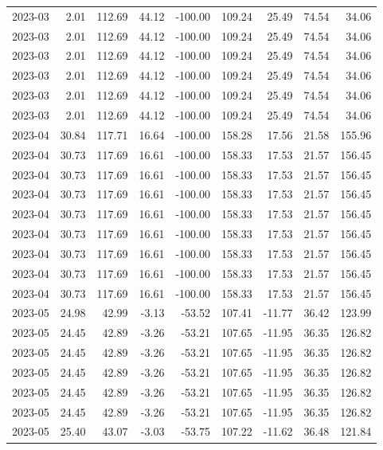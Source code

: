 \begin{table}[ht]
\begin{tabular}{lrrrrrrrr}
  2023-03 & 2.01 & 112.69 & 44.12 & -100.00 & 109.24 & 25.49 & 74.54 & 34.06 \\ 
  2023-03 & 2.01 & 112.69 & 44.12 & -100.00 & 109.24 & 25.49 & 74.54 & 34.06 \\ 
  2023-03 & 2.01 & 112.69 & 44.12 & -100.00 & 109.24 & 25.49 & 74.54 & 34.06 \\ 
  2023-03 & 2.01 & 112.69 & 44.12 & -100.00 & 109.24 & 25.49 & 74.54 & 34.06 \\ 
  2023-03 & 2.01 & 112.69 & 44.12 & -100.00 & 109.24 & 25.49 & 74.54 & 34.06 \\ 
  2023-03 & 2.01 & 112.69 & 44.12 & -100.00 & 109.24 & 25.49 & 74.54 & 34.06 \\ 
  2023-04 & 30.84 & 117.71 & 16.64 & -100.00 & 158.28 & 17.56 & 21.58 & 155.96 \\ 
  2023-04 & 30.73 & 117.69 & 16.61 & -100.00 & 158.33 & 17.53 & 21.57 & 156.45 \\ 
  2023-04 & 30.73 & 117.69 & 16.61 & -100.00 & 158.33 & 17.53 & 21.57 & 156.45 \\ 
  2023-04 & 30.73 & 117.69 & 16.61 & -100.00 & 158.33 & 17.53 & 21.57 & 156.45 \\ 
  2023-04 & 30.73 & 117.69 & 16.61 & -100.00 & 158.33 & 17.53 & 21.57 & 156.45 \\ 
  2023-04 & 30.73 & 117.69 & 16.61 & -100.00 & 158.33 & 17.53 & 21.57 & 156.45 \\ 
  2023-04 & 30.73 & 117.69 & 16.61 & -100.00 & 158.33 & 17.53 & 21.57 & 156.45 \\ 
  2023-04 & 30.73 & 117.69 & 16.61 & -100.00 & 158.33 & 17.53 & 21.57 & 156.45 \\ 
  2023-04 & 30.73 & 117.69 & 16.61 & -100.00 & 158.33 & 17.53 & 21.57 & 156.45 \\ 
  2023-05 & 24.98 & 42.99 & -3.13 & -53.52 & 107.41 & -11.77 & 36.42 & 123.99 \\ 
  2023-05 & 24.45 & 42.89 & -3.26 & -53.21 & 107.65 & -11.95 & 36.35 & 126.82 \\ 
  2023-05 & 24.45 & 42.89 & -3.26 & -53.21 & 107.65 & -11.95 & 36.35 & 126.82 \\ 
  2023-05 & 24.45 & 42.89 & -3.26 & -53.21 & 107.65 & -11.95 & 36.35 & 126.82 \\ 
  2023-05 & 24.45 & 42.89 & -3.26 & -53.21 & 107.65 & -11.95 & 36.35 & 126.82 \\ 
  2023-05 & 24.45 & 42.89 & -3.26 & -53.21 & 107.65 & -11.95 & 36.35 & 126.82 \\ 
  2023-05 & 25.40 & 43.07 & -3.03 & -53.75 & 107.22 & -11.62 & 36.48 & 121.84 \\ 

\end{tabular}
\end{table}
